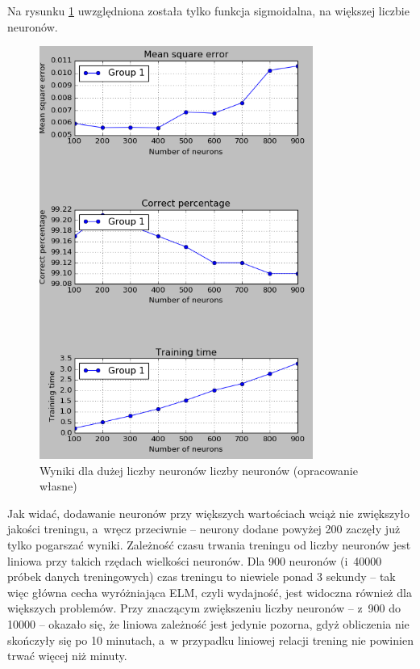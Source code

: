 \documentclass[pl]{minipw} %
\begin{document}
Na rysunku \ref{wyniki_dota2_python_performance} uwzględniona została tylko funkcja sigmoidalna, na większej liczbie neuronów.
\begin{figure}[H]
\centering
\includegraphics[width=0.8\textwidth]{wyniki_dota2_python_performance.png}
\caption[Wyniki dla dużej liczby neuronów liczby neuronów]{Wyniki dla dużej liczby neuronów liczby neuronów (opracowanie własne)}
\label{wyniki_dota2_python_performance}
\end{figure}
Jak widać, dodawanie neuronów przy większych wartościach wciąż nie zwiększyło jakości treningu, a~wręcz przeciwnie -- neurony dodane powyżej 200 zaczęły już tylko pogarszać wyniki. Zależność czasu trwania treningu od liczby neuronów jest liniowa przy takich rzędach wielkości neuronów. Dla 900 neuronów (i~40000 próbek danych treningowych) czas treningu to niewiele ponad 3 sekundy -- tak więc główna cecha wyróżniająca ELM, czyli wydajność, jest widoczna również dla większych problemów. Przy znaczącym zwiększeniu liczby neuronów -- z~900 do 10000 -- okazało się, że liniowa zależność jest jedynie pozorna, gdyż obliczenia nie skończyły się po 10 minutach, a~w przypadku liniowej relacji trening nie powinien trwać więcej niż minuty.
\label{10000_dota2}
\end{document}
